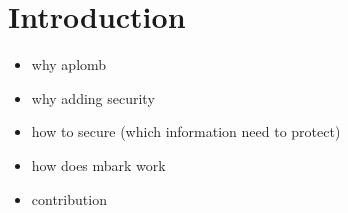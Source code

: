 
\section{Introduction}\label{sec:intro}
\begin{itemize}
\item why aplomb
\item why adding security
\item how to secure (which information need to protect)
\item how does mbark work
\item contribution
\end{itemize}
